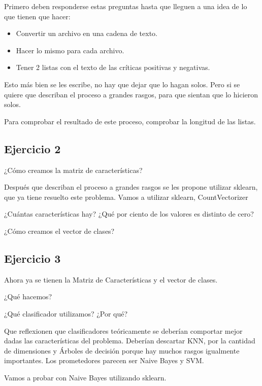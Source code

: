 \documentclass[a4paper,10pt]{article}
\begin{document}
    Primero deben responderse estas preguntas hasta que lleguen a una
    idea de lo que tienen que hacer:
    \begin{itemize}
    	\item Convertir un archivo en una cadena de texto.
    	\item Hacer lo mismo para cada archivo.
    	\item Tener 2 listas con el texto de las críticas positivas y negativas.
    \end{itemize}
    
    Esto más bien se les escribe, no hay que dejar que lo hagan solos.
    Pero si se quiere que describan el proceso a grandes rasgos, para 
    que sientan que lo hicieron solos.
    
    Para comprobar el resultado de este proceso, comprobar la
    longitud de las listas.
    
   
  \subsection*{Ejercicio 2}
    
    ¿Cómo creamos la matriz de características?
    
    Después que describan el proceso a grandes rasgos se les propone utilizar 
    sklearn, que ya tiene resuelto este problema.
    Vamos a utilizar sklearn, CountVectorizer
    
    ¿Cuántas características hay?
    ¿Qué por ciento de los valores es distinto de cero?
    
    ¿Cómo creamos el vector de clases?
     
   \subsection*{Ejercicio 3}
    
    Ahora ya se tienen la Matriz de Características y el vector de clases.
    
    ¿Qué hacemos?
    
    ¿Qué clasificador utilizamos?
    ¿Por qué?
    
    Que reflexionen que clasificadores teóricamente se deberían 
    comportar mejor dadas las características del problema.
    Deberían descartar KNN, por la cantidad de dimensiones y 
    Árboles de decisión porque hay muchos rasgos igualmente importantes. 
    Los prometedores parecen ser Naive Bayes y SVM.
    
    Vamos a probar con Naive Bayes utilizando sklearn.
    
\end{document}
